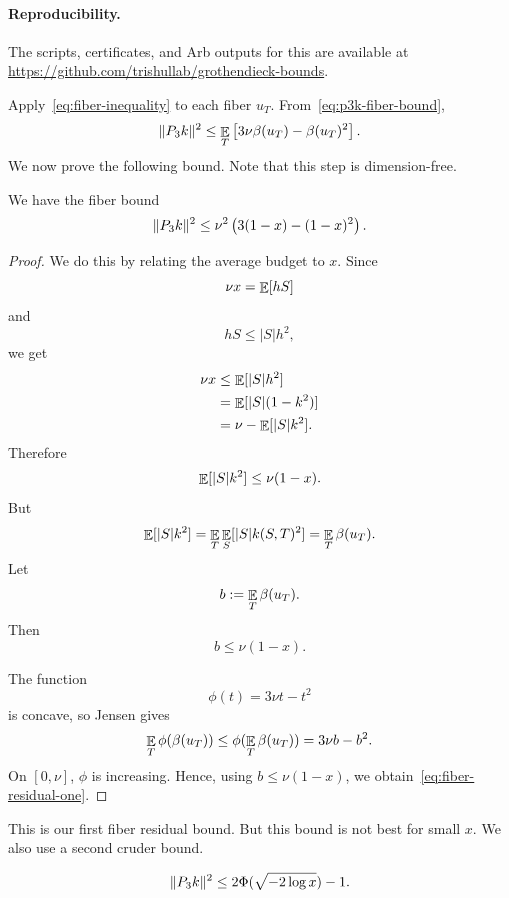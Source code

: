 \paragraph{Reproducibility.}
  The scripts, certificates, and Arb outputs for this 
  are available at \url{https://github.com/trishullab/grothendieck-bounds}. 

\vspace{\baselineskip}

Apply~\eqref{eq:fiber-inequality} to each fiber $u_T$. From~\eqref{eq:p3k-fiber-bound},
\[
        \lVert P_3k\rVert^2
        \le
        \mathop{\mathbb{E}}_T\left[3\nu\beta(u_T)-\beta(u_T)^2\right].
\]
We now prove the following bound. Note that this step is dimension-free.

\begin{theorem}
We have the fiber bound
\begin{equation}
        \lVert P_3k\rVert^2
        \le
        \nu^2\left(3(1-x)-(1-x)^2\right).
        \label{eq:fiber-residual-one}
\end{equation}
\end{theorem}

\begin{proof}
We do this by relating the average budget to $x$. Since
\[
        \nu x=\mathop{\mathbb{E}}[hS]
\]
and
\[
        hS\le |S|h^2,
\]
we get
\begin{align*}
        \nu x
        &\le \mathop{\mathbb{E}}[|S|h^2]\\
        &=\mathop{\mathbb{E}}[|S|(1-k^2)]\\
        &=\nu-\mathop{\mathbb{E}}[|S|k^2].
\end{align*}
Therefore
\[
        \mathop{\mathbb{E}}[|S|k^2]\le \nu(1-x).
\]
But
\[
        \mathop{\mathbb{E}}[|S|k^2]
        =\mathop{\mathbb{E}}_T\mathop{\mathbb{E}}_S[|S|k(S,T)^2]
        =\mathop{\mathbb{E}}_T\beta(u_T).
\]
Let
\[
        b:=\mathop{\mathbb{E}}_T\beta(u_T).
\]
Then
\[
        b\le \nu(1-x).
\]

The function
\[
        \phi(t)=3\nu t-t^2
\]
is concave, so Jensen gives
\[
        \mathop{\mathbb{E}}_T\phi(\beta(u_T))\le \phi(\mathop{\mathbb{E}}_T\beta(u_T))=3\nu b-b^2.
\]
On $[0,\nu]$, $\phi$ is increasing. Hence, using $b\le \nu(1-x)$, we obtain~\eqref{eq:fiber-residual-one}.
\end{proof}

This is our first fiber residual bound. But this bound is not best for small $x$. We also use a second cruder bound.

\begin{theorem}
    \begin{equation}
        \lVert P_3k\rVert^2
        \le
        2\Phi(\sqrt{-2\log x})-1.
        \label{eq:fiber-residual-two}
\end{equation}
\end{theorem}

